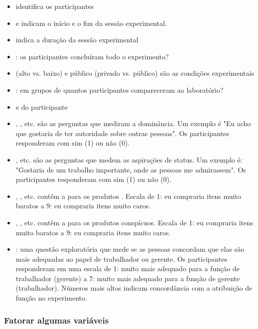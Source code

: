 \documentclass{article}
\begin{document}
\begin{itemize}
\item {} identifica os participantes
\item {} e  indicam o início e o fim da sessão experimental.
\item {} indica a duração da sessão experimental
\item {}: os participantes concluíram todo o experimento?
\item {} (alto vs. baixo) e público (privado vs. público) são as condições experimentais
\item {}: em grupos de quantos participantes compareceram ao laboratório?
\item {} e  do participante
\item {}, , etc. são as perguntas que mediram a dominância. Um exemplo é "Eu acho que gostaria de ter autoridade sobre outras pessoas". Os participantes responderam com sim (1) ou não (0).
\item {},  etc. são as perguntas que medem as aspirações de status. Um exemplo é: "Gostaria de um trabalho importante, onde as pessoas me admirassem". Os participantes responderam com sim (1) ou não (0).
\item {}, , etc. contêm a  para os produtos . Escala de 1: eu compraria itens muito baratos a 9: eu compraria itens muito caros.
\item {}, , etc. contêm a  para os produtos conspícuos. Escala de 1: eu compraria itens muito baratos a 9: eu compraria itens muito caros.
\item {}: uma questão exploratória que mede se as pessoas concordam que elas são mais adequadas ao papel de trabalhador ou gerente. Os participantes responderam em uma escala de 1: muito mais adequado para a função de trabalhador (gerente) a 7: muito mais adequado para a função de gerente (trabalhador). Números mais altos indicam concordância com a atribuição de função no experimento.
\end{itemize}

\subsubsection{Fatorar algumas variáveis}
\end{document}
